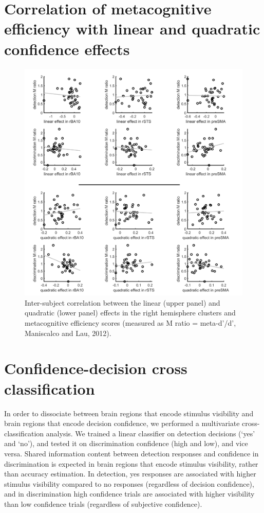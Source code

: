 \documentclass[12pt,twoside]{reedthesis}
\begin{document}
\hypertarget{app3:efficiency}{%
\section{Correlation of metacognitive efficiency with linear and quadratic confidence effects}\label{app3:efficiency}}
\begin{figure}[H]
\includegraphics[width=\linewidth]{figure/fMRI/efficiency} \caption[Inter-subject correlation between the linear and quadratic effects in the right hemisphere clusters and metacognitive efficiency scores]{Inter-subject correlation between the linear (upper panel) and quadratic (lower panel) effects in the right hemisphere clusters and metacognitive efficiency scores (measured as M ratio = meta-d'/d', Maniscalco and Lau, 2012).}\label{fig:varianceRatio}
\end{figure}
\newpage

\hypertarget{app3:cross}{%
\section{Confidence-decision cross classification}\label{app3:cross}}

In order to dissociate between brain regions that encode stimulus visibility and brain regions that encode decision confidence, we performed a multivariate cross-classification analysis. We trained a linear classifier on detection decisions (`yes' and `no'), and tested it on discrimination confidence (high and low), and vice versa. Shared information content between detection responses and confidence in discrimination is expected in brain regions that encode stimulus visibility, rather than accuracy estimation. In detection, yes responses are associated with higher stimulus visibility compared to no responses (regardless of decision confidence), and in discrimination high confidence trials are associated with higher visibility than low confidence trials (regardless of subjective confidence).
\end{document}

